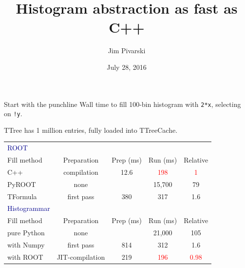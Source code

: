 \documentclass{beamer}
\title[2016-07-28-root-jit]{Histogram abstraction as fast as C++}
\author{Jim Pivarski}
\institute{Princeton University -- DIANA}
\date{July 28, 2016}
\begin{document}

\begin{frame}
  \titlepage
\end{frame}



\begin{frame}{Start with the punchline}
\vspace{0.25 cm}
Wall time to fill 100-bin histogram with {\tt \small 2*x}, selecting on {\tt \small !y}.

TTree has 1 million entries, fully loaded into TTreeCache.

\renewcommand{\arraystretch}{1.2}
\vspace{0.25 cm}
\begin{tabular}{l c c c c}
\textcolor{darkblue}{ROOT} & & & & \\
Fill method & Preparation & Prep (ms) & Run (ms) & Relative \\\hline
C++ & compilation & 12.6 & \textcolor{red}{198} & \textcolor{red}{1} \\
PyROOT & none & & 15,700 & 79 \\
TFormula & first pass & 380 & 317 & 1.6\vspace{0.25 cm} \\
\textcolor{darkblue}{Histogrammar} & & & & \\
Fill method & Preparation & Prep (ms) & Run (ms) & Relative \\\hline
pure Python & none & & 21,000 & 105 \\
with Numpy & first pass & 814 & 312 & 1.6 \\
with ROOT & JIT-compilation & 219 & \textcolor{red}{196} & \textcolor{red}{0.98} \\
\end{tabular}
\end{frame}
\end{document}
